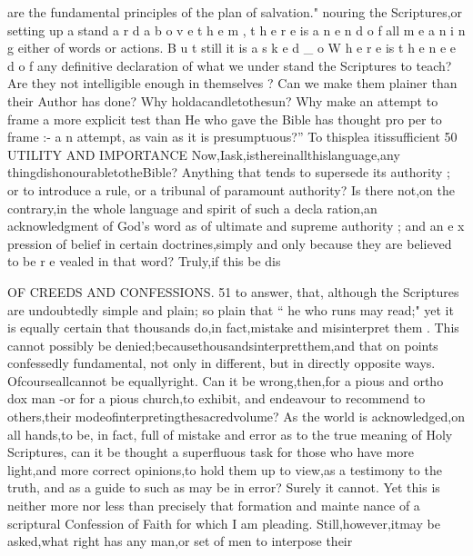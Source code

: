 \documentclass[
]{book}
\begin{document}
are the fundamental principles of the plan of salvation."
nouring the Scriptures,or setting up a stand a r d a b o v e t h e m , t h e r e is a n e n d o f all m e a n i n g either of words or actions.
B u t still it is a s k e d \_ o W h e r e is t h e n e e d o f
any definitive declaration of what we under stand the Scriptures to teach? Are they not intelligible enough in themselves ? Can we make them plainer than their Author has done? Why holdacandletothesun? Why make an attempt to frame a more explicit test than He who gave the Bible has thought pro per to frame :- a n attempt, as vain as it is presumptuous?'' To thisplea itissufficient
50 UTILITY AND IMPORTANCE
Now,Iask,isthereinallthislanguage,any
thingdishonourabletotheBible? Anything that tends to supersede its authority ; or to
introduce a rule, or a tribunal of paramount authority? Is there not,on the contrary,in
the whole language and spirit of such a decla ration,an acknowledgment of God's word as of ultimate and supreme authority ; and an e x pression of belief in certain doctrines,simply and only because they are believed to be r e vealed in that word? Truly,if this be dis

OF CREEDS AND CONFESSIONS. 51
to answer, that, although the Scriptures are undoubtedly simple and plain; so plain that
`` he who runs may read;" yet it is equally certain that thousands do,in fact,mistake and misinterpret them . This cannot possibly be denied;becausethousandsinterpretthem,and that on points confessedly fundamental, not only in different, but in directly opposite ways. Ofcourseallcannot be equallyright. Can it be wrong,then,for a pious and ortho dox man -or for a pious church,to exhibit, and endeavour to recommend to others,their modeofinterpretingthesacredvolume? As the world is acknowledged,on all hands,to be, in fact, full of mistake and error as to the true meaning of Holy Scriptures, can it be thought a superfluous task for those who have
more light,and more correct opinions,to hold them up to view,as a testimony to the truth, and as a guide to such as may be in error? Surely it cannot. Yet this is neither more nor less than precisely that formation and mainte nance of a scriptural Confession of Faith for which I am pleading.
Still,however,itmay be asked,what right has any man,or set of men to interpose their
\end{document}
